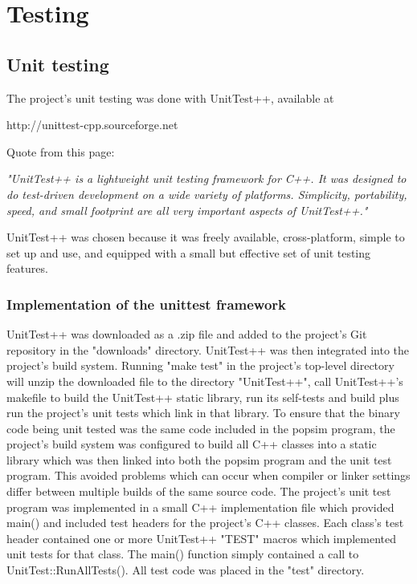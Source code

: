 \section{Testing}
\label{Testing}

\subsection{Unit testing}
\label{unittesting}

The project's unit testing was done with UnitTest++, available at
\begin{center}
 http://unittest-cpp.sourceforge.net
\end{center}
Quote from this page:
\begin{center}
 \textit{"UnitTest++ is a lightweight unit testing framework for C++.  It was designed to do test-driven development on a wide variety of platforms. Simplicity, portability, speed, and small footprint are all very important aspects of UnitTest++."}
\end{center}

UnitTest++ was chosen because it was freely available, cross-platform, simple to set up and use, and equipped with a small but effective set of unit testing features. 
\subsubsection{Implementation of the unittest framework}
UnitTest++ was downloaded as a .zip file and added to the project's Git repository in the "downloads" directory.
UnitTest++ was then integrated into the project's build system. Running "make test" in the project's top-level directory will unzip the downloaded file to the directory "UnitTest++", call UnitTest++'s makefile to build the UnitTest++ static library, run its self-tests and build plus run the project's unit tests which link in that library.
To ensure that the binary code being unit tested was the same code included in the popsim program, the project's build system was configured to build all C++ classes into a static library which was then linked into both the popsim program and the unit test program. This avoided problems which can occur when compiler or linker settings differ between multiple builds of the same source code.
The project's unit test program was implemented in a small C++ implementation file which provided main() and included test headers for the project's C++ classes.  Each class's test header contained one or more UnitTest++ "TEST" macros which implemented unit tests for that class.  The main() function simply contained a call to UnitTest::RunAllTests(). All test code was placed in the "test" directory.


